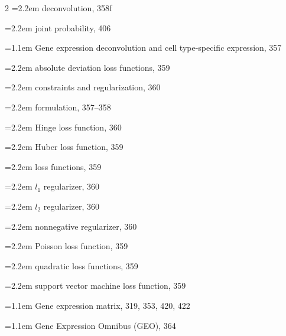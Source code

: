 \begin{multicols}{2}
\noindent\hangindent=2.2em \hspace*{1.1em}deconvolution, 358f\par
\noindent\hangindent=2.2em \hspace*{1.1em}joint probability, 406\par
\noindent\hangindent=1.1em Gene expression deconvolution and cell type-specific expression, 357\par
\noindent\hangindent=2.2em \hspace*{1.1em}absolute deviation loss functions, 359\par
\noindent\hangindent=2.2em \hspace*{1.1em}constraints and regularization, 360\par
\noindent\hangindent=2.2em \hspace*{1.1em}formulation, 357--358\par
\noindent\hangindent=2.2em \hspace*{1.1em}Hinge loss function, 360\par
\noindent\hangindent=2.2em \hspace*{1.1em}Huber loss function, 359\par
\noindent\hangindent=2.2em \hspace*{1.1em}loss functions, 359\par
\noindent\hangindent=2.2em \hspace*{1.1em}$l_{1}$ regularizer, 360\par
\noindent\hangindent=2.2em \hspace*{1.1em}$l_{2}$ regularizer, 360\par
\noindent\hangindent=2.2em \hspace*{1.1em}nonnegative regularizer, 360\par
\noindent\hangindent=2.2em \hspace*{1.1em}Poisson loss function, 359\par
\noindent\hangindent=2.2em \hspace*{1.1em}quadratic loss functions, 359\par
\noindent\hangindent=2.2em \hspace*{1.1em}support vector machine loss function, 359\par
\noindent\hangindent=1.1em Gene expression matrix, 319, 353, 420, 422\par
\noindent\hangindent=1.1em Gene Expression Omnibus (GEO), 364\par

\end{multicols}
